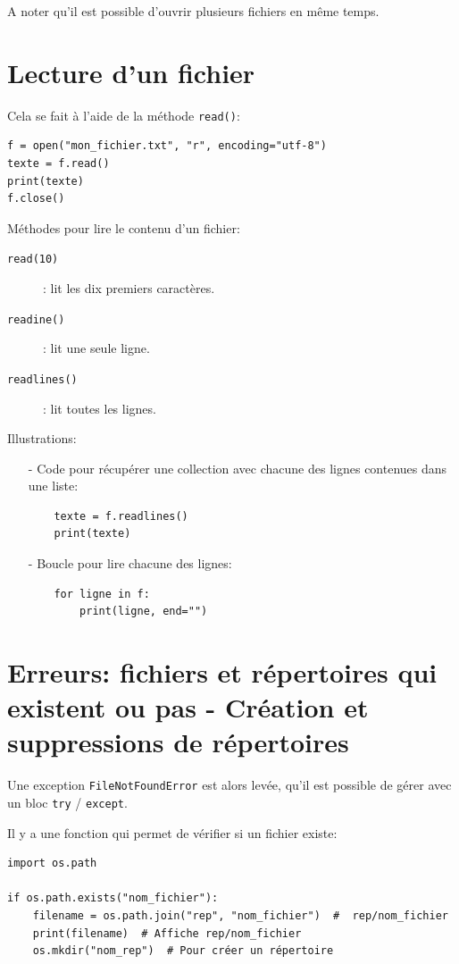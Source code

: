 \documentclass[a4paper,11pt]{book}
\begin{document}
A noter qu'il est possible d'ouvrir plusieurs fichiers en même temps.
\medskip

\section{Lecture d'un fichier}
Cela se fait à l'aide de la méthode \texttt{read()}:
\begin{lstlisting}
f = open("mon_fichier.txt", "r", encoding="utf-8")
texte = f.read()
print(texte)
f.close()
\end{lstlisting}
\medskip

Méthodes pour lire le contenu d'un fichier:
\begin{description}
    \item[\texttt{read(10)}]: lit les dix premiers caractères.
    \item[\texttt{readine()}]: lit une seule ligne.
    \item[\texttt{readlines()}]: lit toutes les lignes.
\end{description}
\medskip

Illustrations:
\begin{itemize}
	\item[-] Code pour récupérer une collection avec chacune des lignes contenues dans une liste:
	\begin{lstlisting}
	texte = f.readlines()
	print(texte)
	\end{lstlisting}
	\item[-] Boucle pour lire chacune des lignes:
	\begin{lstlisting}
	for ligne in f:
	    print(ligne, end="")
	\end{lstlisting}
\end{itemize}
\medskip

\section{Erreurs: fichiers et répertoires qui existent ou pas - Création et suppressions de répertoires}
Une exception \texttt{FileNotFoundError} est alors levée, qu'il est possible de gérer avec un bloc \texttt{try} / \texttt{except}.
\medskip

Il y a une fonction qui permet de vérifier si un fichier existe:
\begin{lstlisting}
import os.path

if os.path.exists("nom_fichier"):
	filename = os.path.join("rep", "nom_fichier")  #  rep/nom_fichier
	print(filename)  # Affiche rep/nom_fichier
	os.mkdir("nom_rep")  # Pour créer un répertoire
\end{lstlisting}
\medskip
\end{document}
